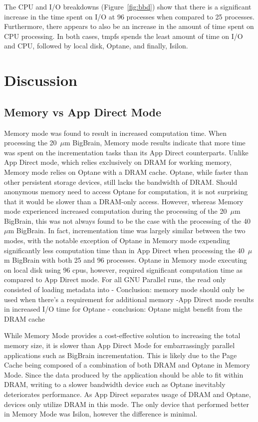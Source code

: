 \documentclass[conference]{IEEEtran}
\newcommand{\bigbrain}{BigBrain\xspace}
\begin{document}
The CPU and I/O breakdowns (Figure~\ref{fig:bbd}) show that there is a significant increase
in the time spent on I/O at 96 processes when compared to 25 processes. Furthermore, there appears
to also be an increase in the amount of time spent on CPU processing. In both cases,
tmpfs spends the least amount of time on I/O and CPU, followed by local disk, Optane, and finally,
Isilon.
\section{Discussion}
\subsection{Memory vs App Direct Mode}

Memory mode was found to result in increased computation time. When processing 
the 20~$\mu$m \bigbrain, Memory mode results indicate that more time was spent on
the incrementation tasks than its App Direct counterparts. Unlike App Direct mode,
which relies exclusively on DRAM for working memory, Memory mode relies on Optane
with a DRAM cache. Optane, while faster than other persistent storage devices, 
still lacks the bandwidth of DRAM. Should anonymous memory need to access Optane
for computation, it is not surprising that it would be slower than a DRAM-only
access. However, whereas Memory mode experienced increased computation during the
processing of the 20~$\mu$m \bigbrain, this was not always found to be the case
with the processing of the 40~$\mu$m \bigbrain. In fact, incrementation time was
largely similar between the two modes, with the notable exception of Optane in
Memory mode expending significantly less computation time than in App Direct when
processing the 40~$\mu$m \bigbrain with both 25 and 96 processes. Optane in 
Memory mode executing on local disk using 96 cpus, however, required significant
computation time as compared to App Direct mode. For all GNU Parallel runs, the 
read only consisted of loading metadata into
- Conclusion: memory mode should only be used when there's a requirement for additional memory
-App Direct mode results in increased I/O time for Optane
- conclusion: Optane might benefit from the DRAM cache



While Memory Mode provides a cost-effective solution to increasing the total memory
size, it is slower than App Direct Mode for embarrassingly parallel applications such
as \bigbrain incrementation. This is likely due to the Page Cache being composed of a
combination of both DRAM and Optane in Memory Mode. Since the data produced by the application should be
able to fit within DRAM, writing to a slower bandwidth device such as Optane inevitably
deteriorates performance. As App Direct separates usage of DRAM and Optane, devices only utilize DRAM in this mode.
The only device that performed better in Memory Mode was 
Isilon, however the difference is minimal.
\end{document}
